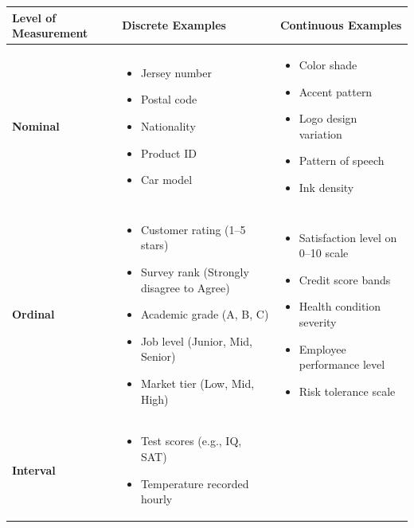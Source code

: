 \documentclass[12pt,a4paper]{book}
\begin{document}
\vspace{0.3cm}

\begin{table}[h!]
\centering

\begin{tabular}{|p{3cm}|p{6cm}|p{6cm}|}
\hline
\textbf{Level of Measurement} & \textbf{Discrete Examples} & \textbf{Continuous Examples} \\
\hline
\textbf{Nominal} &
\begin{itemize}
    \item Jersey number
    \item Postal code
    \item Nationality
    \item Product ID
    \item Car model
\end{itemize}
&
\begin{itemize}
    \item Color shade
    \item Accent pattern
    \item Logo design variation
    \item Pattern of speech
    \item Ink density
\end{itemize}
\\
\hline
\textbf{Ordinal} &
\begin{itemize}
    \item Customer rating (1–5 stars)
    \item Survey rank (Strongly disagree to Agree)
    \item Academic grade (A, B, C)
    \item Job level (Junior, Mid, Senior)
    \item Market tier (Low, Mid, High)
\end{itemize}
&
\begin{itemize}
    \item Satisfaction level on 0–10 scale
    \item Credit score bands
    \item Health condition severity
    \item Employee performance level
    \item Risk tolerance scale
\end{itemize}
\\
\hline
\textbf{Interval} &
\begin{itemize}
    \item Test scores (e.g., IQ, SAT)
    \item Temperature recorded hourly

\end{itemize}
\end{tabular}
\end{table}
\end{document}
